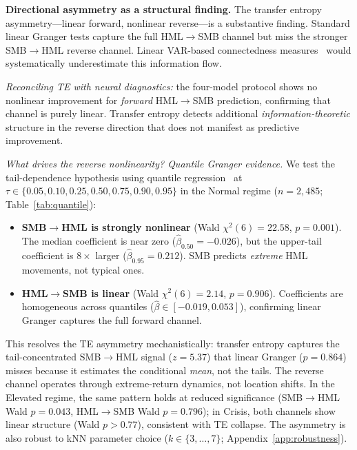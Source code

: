 \documentclass[sigconf,anonymous]{acmart}
\begin{document}
\textbf{Directional asymmetry as a structural finding.}
The transfer entropy asymmetry---linear forward, nonlinear reverse---is a
substantive finding. Standard linear Granger tests capture the full
HML$\to$SMB channel but miss the stronger SMB$\to$HML reverse channel.
Linear VAR-based connectedness measures~\cite{diebold2012better} would
systematically underestimate this information flow.

\emph{Reconciling TE with neural diagnostics:} the four-model protocol
shows no nonlinear improvement for \emph{forward} HML$\to$SMB prediction,
confirming that channel is purely linear. Transfer entropy detects
additional \emph{information-theoretic} structure in the reverse direction
that does not manifest as predictive improvement.

\emph{What drives the reverse nonlinearity? Quantile Granger evidence.}
We test the tail-dependence hypothesis using quantile
regression~\cite{troster2019testing} at
$\tau \in \{0.05, 0.10, 0.25, 0.50, 0.75, 0.90, 0.95\}$
in the Normal regime ($n = 2{,}485$; Table~\ref{tab:quantile}):

\begin{itemize}
    \item \textbf{SMB$\to$HML is strongly nonlinear} (Wald $\chi^2(6) = 22.58$,
    $p = 0.001$). The median coefficient is near zero
    ($\hat{\beta}_{0.50} = -0.026$), but the upper-tail
    coefficient is $8\times$ larger ($\hat{\beta}_{0.95} = 0.212$).
    SMB predicts \emph{extreme} HML movements, not typical ones.
    \item \textbf{HML$\to$SMB is linear} (Wald $\chi^2(6) = 2.14$,
    $p = 0.906$). Coefficients are homogeneous across quantiles
    ($\hat{\beta} \in [-0.019, 0.053]$), confirming linear Granger
    captures the full forward channel.
\end{itemize}

This resolves the TE asymmetry mechanistically:
transfer entropy captures the tail-concentrated SMB$\to$HML
signal ($z = 5.37$) that linear Granger ($p = 0.864$) misses
because it estimates the conditional \emph{mean}, not the tails.
The reverse channel operates through extreme-return dynamics,
not location shifts. In the Elevated regime, the same pattern holds
at reduced significance (SMB$\to$HML Wald $p = 0.043$,
HML$\to$SMB Wald $p = 0.796$); in Crisis, both channels show
linear structure (Wald $p > 0.77$), consistent with TE collapse.
The asymmetry is also robust to kNN parameter choice
($k \in \{3,\ldots,7\}$; Appendix~\ref{app:robustness}).
\end{document}
